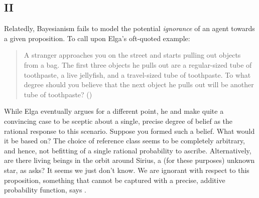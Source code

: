 \documentclass[11pt, a4paper]{scrartcl}
\begin{document}
\subsection{II}Relatedly, Bayesianism fails to model the potential \emph{ignorance} of an agent towards a given proposition. To call upon Elga's oft-quoted example:
\begin{quote}
A stranger approaches you on the street and starts pulling out objects from a bag. The first three objects he pulls out are a regular-sized tube of toothpaste, a live jellyfish, and a travel-sized tube of toothpaste. To what degree should you believe that the next object he pulls out will be another tube of toothpaste?
(\cite{Elga2010-ELGSPS})
\end{quote}
While Elga eventually argues for a different point, he and \citet{sep-imprecise-probabilities} make quite a convincing case to be sceptic about a single, precise degree of belief as the rational response to this scenario. Suppose you formed such a belief. What would it be based on? The choice of reference class seems to be completely arbitrary, and hence, not befitting of a single rational probability to ascribe. Alternatively, are there living beings in the orbit around Sirius, a (for these purposes) unknown star, as \citet{Shafer1976-SHAAMT} asks? It seems we just don't know. We are ignorant with respect to this proposition, something that cannot be captured with a precise, additive probability function, says \citet{Norton2011-NORCTB}.
\end{document}
